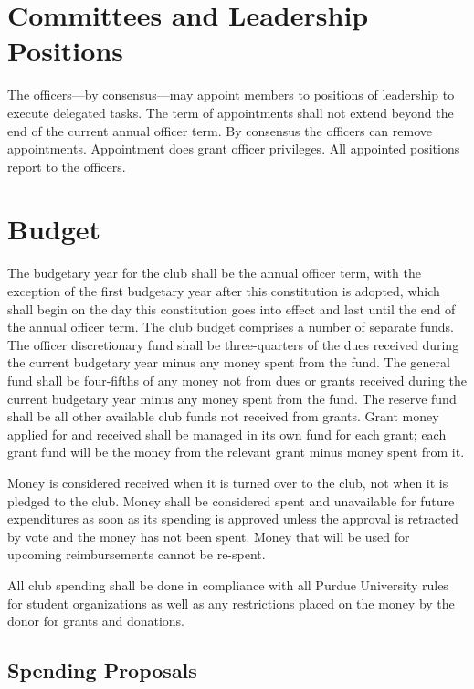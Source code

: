 \documentclass{article}
\begin{document}
\section{Committees and Leadership Positions}

The officers---by consensus---may appoint members to positions of leadership to
execute delegated tasks. The term of appointments shall not extend beyond the
end of the current annual officer term. By consensus the officers can remove
appointments. Appointment does grant officer privileges. All appointed positions
report to the officers.

\section{Budget}

The budgetary year for the club shall be the annual officer term, with the
exception of the first budgetary year after this constitution is adopted, which
shall begin on the day this constitution goes into effect and last until the end
of the annual officer term. The club budget comprises a number of separate
funds. The officer discretionary fund shall be three-quarters of the dues
received during the current budgetary year minus any money spent from the fund.
The general fund shall be four-fifths of any money not from dues or grants
received during the current budgetary year minus any money spent from the fund.
The reserve fund shall be all other available club funds not received from
grants. Grant money applied for and received shall be managed in its own fund
for each grant; each grant fund will be the money from the relevant grant minus
money spent from it.

Money is considered received when it is turned over to the club, not when it is
pledged to the club. Money shall be considered spent and unavailable for future
expenditures as soon as its spending is approved unless the approval is
retracted by vote and the money has not been spent. Money that will be used for
upcoming reimbursements cannot be re-spent.

All club spending shall be done in compliance with all Purdue University rules
for student organizations as well as any restrictions placed on the money by the
donor for grants and donations.

\subsection{Spending Proposals}
\end{document}

